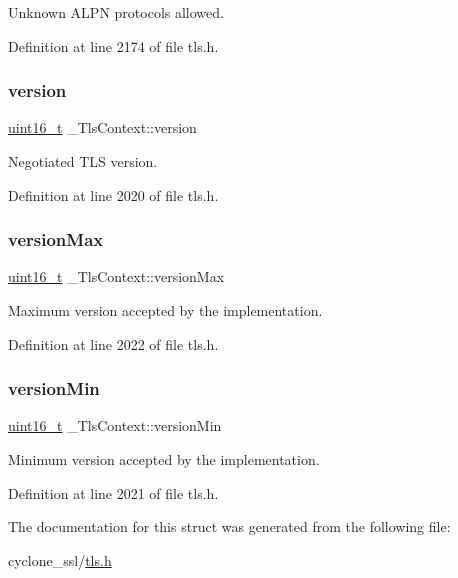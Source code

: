 Unknown A\+L\+PN protocols allowed. 



Definition at line 2174 of file tls.\+h.

\mbox{\label{struct__TlsContext_a472d3c53bc6ef0e507b600782059b969}} 
\subsubsection{\texorpdfstring{version}{version}}
{\footnotesize\ttfamily \hyperlink{stdint_8h_a273cf69d639a59973b6019625df33e30}{uint16\+\_\+t} \+\_\+\+Tls\+Context\+::version}



Negotiated T\+LS version. 



Definition at line 2020 of file tls.\+h.

\mbox{\label{struct__TlsContext_ace8ccb768f41e42901036f6a4baeb35d}} 
\subsubsection{\texorpdfstring{version\+Max}{versionMax}}
{\footnotesize\ttfamily \hyperlink{stdint_8h_a273cf69d639a59973b6019625df33e30}{uint16\+\_\+t} \+\_\+\+Tls\+Context\+::version\+Max}



Maximum version accepted by the implementation. 



Definition at line 2022 of file tls.\+h.

\mbox{\label{struct__TlsContext_abf0de5686d025b3399ff395da071e1cd}} 
\subsubsection{\texorpdfstring{version\+Min}{versionMin}}
{\footnotesize\ttfamily \hyperlink{stdint_8h_a273cf69d639a59973b6019625df33e30}{uint16\+\_\+t} \+\_\+\+Tls\+Context\+::version\+Min}



Minimum version accepted by the implementation. 



Definition at line 2021 of file tls.\+h.



The documentation for this struct was generated from the following file\+:\begin{DoxyCompactItemize}
\item 
cyclone\+\_\+ssl/\hyperlink{tls_8h}{tls.\+h}\end{DoxyCompactItemize}
